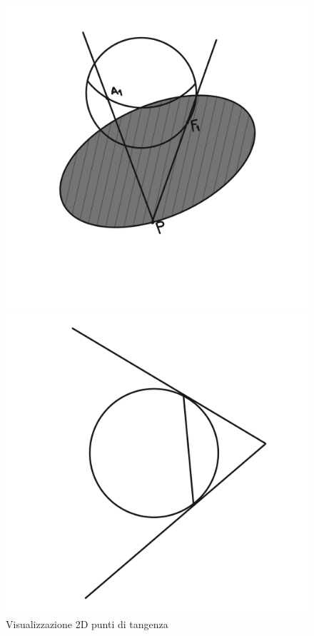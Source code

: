\documentclass[a4paper,11pt]{article}
\begin{document}
\begin{figure}[!tbp]
        \centering
        \begin{minipage}[b]{0.4\textwidth}
          \includegraphics[width=\textwidth]{ez.png}
          \caption{\(\left\lVert \vec{PF_1}  \right\rVert  = \left\lVert \vec{PA_1}  \right\rVert \)}
        \end{minipage}
        \hfill
        \begin{minipage}[b]{0.4\textwidth}
          \includegraphics[width=\textwidth]{Untitled_4.png}
          \caption{Visualizzazione 2D punti di tangenza}
        \end{minipage}
      \end{figure}
\end{document}
